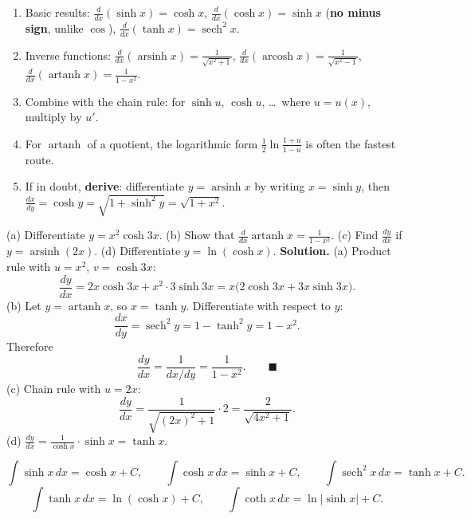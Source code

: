 \documentclass[11pt]{article}
\begin{document}
\begin{methode}
\begin{enumerate}
\item Basic results: $\frac{d}{dx}(\sinh x)=\cosh x$, $\frac{d}{dx}(\cosh x)=\sinh x$ (\textbf{no minus sign}, unlike $\cos$), $\frac{d}{dx}(\tanh x)=\operatorname{sech}^{2}x$.
\item Inverse functions: $\frac{d}{dx}(\operatorname{arsinh}x)=\frac{1}{\sqrt{x^{2}+1}}$, $\frac{d}{dx}(\operatorname{arcosh}x)=\frac{1}{\sqrt{x^{2}-1}}$, $\frac{d}{dx}(\operatorname{artanh}x)=\frac{1}{1-x^{2}}$.
\item Combine with the chain rule: for $\sinh u$, $\cosh u$, \ldots\ where $u=u(x)$, multiply by $u'$.
\item For $\operatorname{artanh}$ of a quotient, the logarithmic form $\frac{1}{2}\ln\frac{1+u}{1-u}$ is often the fastest route.
\item If in doubt, \textbf{derive}: differentiate $y=\operatorname{arsinh}x$ by writing $x=\sinh y$, then $\frac{dx}{dy}=\cosh y=\sqrt{1+\sinh^{2}y}=\sqrt{1+x^{2}}$.
\end{enumerate}
\end{methode}

\begin{exoresolu}
(a) Differentiate $y=x^{2}\cosh 3x$. \quad (b) Show that $\frac{d}{dx}\operatorname{artanh}x=\frac{1}{1-x^{2}}$. \quad (c) Find $\frac{dy}{dx}$ if $y=\operatorname{arsinh}(2x)$. \quad (d) Differentiate $y=\ln(\cosh x)$.
\tcblower
\textbf{Solution.} (a) Product rule with $u=x^{2}$, $v=\cosh 3x$:
\[ \frac{dy}{dx}=2x\cosh 3x + x^{2}\cdot 3\sinh 3x = x\bigl(2\cosh 3x+3x\sinh 3x\bigr). \]
(b) Let $y=\operatorname{artanh}x$, so $x=\tanh y$. Differentiate with respect to $y$:
\[ \frac{dx}{dy}=\operatorname{sech}^{2}y=1-\tanh^{2}y=1-x^{2}. \]
Therefore
\[ \frac{dy}{dx}=\frac{1}{dx/dy}=\frac{1}{1-x^{2}}. \qquad\blacksquare \]
(c) Chain rule with $u=2x$:
\[ \frac{dy}{dx}=\frac{1}{\sqrt{(2x)^{2}+1}}\cdot 2=\frac{2}{\sqrt{4x^{2}+1}}. \]
(d) $\frac{dy}{dx} = \frac{1}{\cosh x}\cdot \sinh x = \tanh x$.
\end{exoresolu}

\begin{propriete}
\[
\int\sinh x\,dx = \cosh x + C,\qquad
\int\cosh x\,dx = \sinh x + C,\qquad
\int\operatorname{sech}^{2}x\,dx = \tanh x + C.
\]
\[
\int\tanh x\,dx = \ln(\cosh x) + C,\qquad
\int\coth x\,dx = \ln|\sinh x| + C.
\]
\end{propriete}
\end{document}
